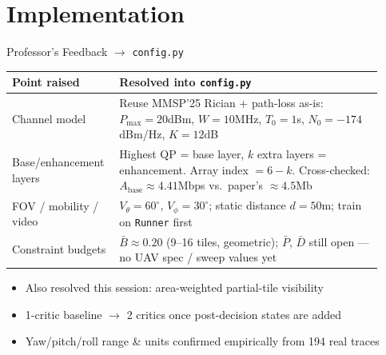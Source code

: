 \documentclass[aspectratio=169]{beamer}
\begin{document}
\section{Implementation}

\begin{frame}{Professor's Feedback $\to$ \texttt{config.py}}
  \begin{center}
  \footnotesize
  \begin{tabular}{@{}>{\raggedright\arraybackslash}p{0.24\linewidth}>{\raggedright\arraybackslash}p{0.68\linewidth}@{}}
    \toprule
    \textbf{Point raised} & \textbf{Resolved into \texttt{config.py}} \\
    \midrule
    Channel model & Reuse MMSP'25 Rician + path-loss as-is: $P_{\max}{=}20$dBm, $W{=}10$MHz, $T_0{=}1$s, $N_0{=}{-}174$dBm/Hz, $K{=}12$dB \\
    Base/enhancement layers & Highest QP = base layer, $k$ extra layers = enhancement. Array index $= 6-k$. Cross-checked: $A_{\text{base}}\approx4.41$Mbps vs.\ paper's $\approx4.5$Mb \\
    FOV / mobility / video & $V_\theta{=}60^\circ$, $V_\phi{=}30^\circ$; static distance $d{=}50$m; train on \texttt{Runner} first \\
    Constraint budgets & $\bar B\approx0.20$ (9--16 tiles, geometric); $\bar P$, $\bar D$ still open --- no UAV spec / sweep values yet \\
    \bottomrule
  \end{tabular}
  \end{center}

  \vspace{4pt}
  \scriptsize
  \begin{itemize}
    \item Also resolved this session: area-weighted partial-tile visibility
    \item 1-critic baseline $\to$ 2 critics once post-decision states are added
    \item Yaw/pitch/roll range \& units confirmed empirically from 194 real traces
  \end{itemize}
\end{frame}
\end{document}
